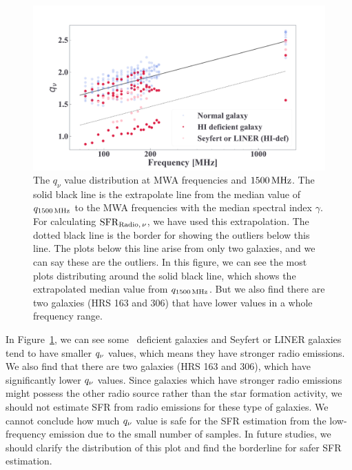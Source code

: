\begin{figure}[htbp]
	\centering
	\includegraphics[width=\linewidth]{Chapter_6/Figures/Discuss_compareq.pdf}
    \caption[$\qn$ plots for each galaxy with labels]{\label{fig:comparehist_q}
        The $q_{\nu}$ value distribution at MWA frequencies and $1500\,\mathrm{MHz}$.
        The solid black line is the extrapolate line from the median value of $q_{\mathrm{1500\,\mathrm{MHz}}}$ to the MWA frequencies with the median spectral index $\gamma$.
        For calculating $\mathrm{SFR}_{\mathrm{Radio},\,\nu}$, we have used this extrapolation. The dotted black line is the border for showing the outliers below this line.
        The plots below this line arise from only two galaxies, and we can say these are the outliers.
        In this figure, we can see the most plots distributing around the solid black line, which shows the extrapolated median value from $q_{\mathrm{1500\,\mathrm{MHz}}}$.
        But we also find there are two galaxies (HRS 163 and 306) that have lower values in a whole frequency range.
    }
\end{figure}

In Figure~\ref{fig:comparehist_q}, we can see some \nh~deficient galaxies and Seyfert or LINER galaxies tend to have smaller $\qn$ values, which means they have stronger radio emissions.
We also find that there are two galaxies (HRS 163 and 306), which have significantly lower $\qn$ values.
Since galaxies which have stronger radio emissions might possess the other radio source rather than the star formation activity, we should not estimate SFR from radio emissions for these type of galaxies.
We cannot conclude how much $\qn$ value is safe for the SFR estimation from the low-frequency emission due to the small number of samples.
In future studies, we should clarify the distribution of this plot and find the borderline for safer SFR estimation.


